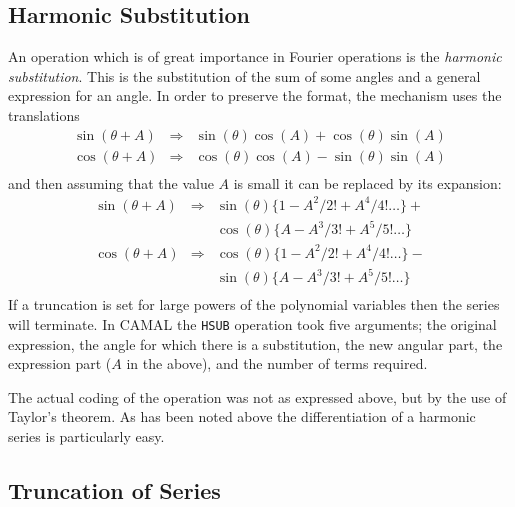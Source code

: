 \subsection{Harmonic Substitution}

An operation which is of great importance in Fourier operations is the
{\em harmonic substitution}.  This is the substitution of the sum of
some angles and a general expression for an angle.  In order to
preserve the format, the mechanism uses the translations
\begin{eqnarray*}
\sin(\theta + A) & \Rightarrow & \sin(\theta) \cos(A) +
                                 \cos(\theta) \sin(A) \\
\cos(\theta + A) & \Rightarrow & \cos(\theta) \cos(A) -
                                 \sin(\theta) \sin(A) \\
\end{eqnarray*}
and then assuming that the value $A$ is small it can be replaced by
its expansion:
\begin{eqnarray*}
\sin(\theta + A) & \Rightarrow & \sin(\theta) \{1 - A^2/2! + A^4/4!\ldots\} +\\
                 &             & \cos(\theta) \{A - A^3/3! + A^5/5!\ldots\} \\
\cos(\theta + A) & \Rightarrow & \cos(\theta) \{1 - A^2/2! + A^4/4!\ldots\} -\\
                 &             & \sin(\theta) \{A - A^3/3! + A^5/5! \ldots\} \\
\end{eqnarray*}
If a truncation is set for large powers of the polynomial variables
then the series will terminate.  In CAMAL the {\tt HSUB} operation
took five arguments; the original expression, the angle for which
there is a substitution, the new angular part, the expression part
($A$ in the above), and the number of terms required.

The actual coding of the operation was not as expressed above, but by
the use of Taylor's theorem.  As has been noted above the
differentiation of a harmonic series is particularly easy.

\subsection{Truncation of Series}

